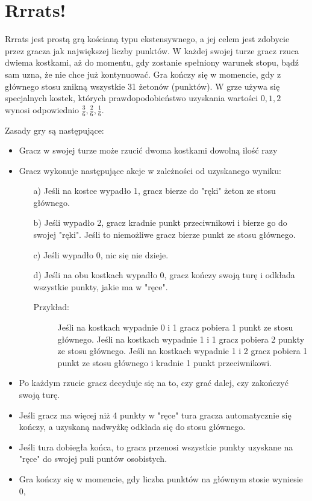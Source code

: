 \documentclass[inzynierska]{pwr_wmat_praca_dyplomowa}
\theoremstyle{plain}
\numberwithin{theorem}{chapter}
\theoremstyle{definition}
\numberwithin{theorem}{chapter}
\begin{document}
	\section{Rrrats!}
	Rrrats jest prostą grą kościaną typu ekstensywnego, a jej celem jest zdobycie przez gracza jak największej liczby punktów. W każdej swojej turze gracz rzuca dwiema kostkami, aż do momentu, gdy zostanie spełniony warunek stopu, bądź sam uzna, że nie chce już kontynuować. Gra kończy się w momencie, gdy z głównego stosu znikną wszystkie 31 żetonów (punktów). W grze używa się specjalnych kostek, których prawdopodobieństwo uzyskania wartości $0, 1, 2$ wynosi odpowiednio $\frac{3}{6}, \frac{2}{6}, \frac{1}{6}$.

	Zasady gry są następujące:
	\begin{itemize}[]
		\item Gracz w swojej turze może rzucić dwoma kostkami dowolną ilość razy
		\item  Gracz wykonuje następujące akcje w zależności od uzyskanego wyniku:
		\begin{enumerate}
			\item[a)] Jeśli na kostce wypadło 1, gracz bierze do "ręki" żeton ze stosu głównego.
			\item[b)] Jeśli wypadło 2, gracz kradnie punkt przeciwnikowi i bierze go do swojej "ręki". Jeśli to niemożliwe gracz bierze punkt ze stosu głównego. 
			\item[c)] Jeśli wypadło 0, nic się nie dzieje.
			\item[d)] Jeśli na obu kostkach wypadło 0, gracz kończy swoją turę i odkłada wszystkie punkty, jakie ma w "ręce".
			\begin{description}
				\item[Przykład:] Jeśli na kostkach wypadnie 0 i 1 gracz pobiera 1 punkt ze stosu głównego. Jeśli na kostkach wypadnie 1 i 1 gracz pobiera 2 punkty ze stosu głównego. Jeśli na kostkach wypadnie 1 i 2 gracz pobiera 1 punkt ze stosu głównego i kradnie 1 punkt przeciwnikowi. 
			\end{description}		
		\end{enumerate}
		\item Po każdym rzucie gracz decyduje się na to, czy grać dalej, czy zakończyć swoją turę.
		
		\item Jeśli gracz ma więcej niż 4 punkty w "ręce" tura gracza automatycznie się kończy, a uzyskaną nadwyżkę odkłada się do stosu głównego.
		
		\item Jeśli tura dobiegła końca, to gracz przenosi wszystkie punkty uzyskane na "ręce" do swojej puli puntów osobistych.
		
		\item Gra kończy się w momencie, gdy liczba punktów na głównym stosie wyniesie 0,
	\end{itemize}
\end{document}
